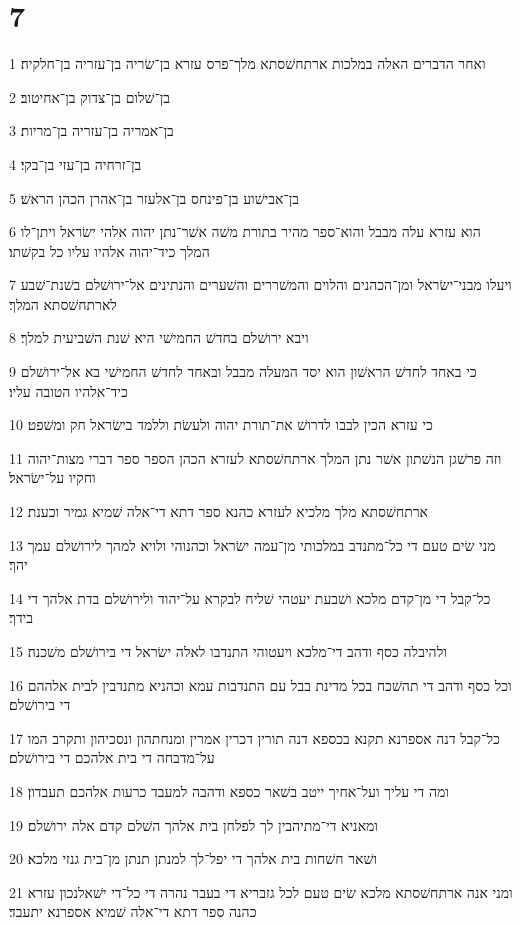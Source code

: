 \chapter{7}

\par 1 ואחר הדברים האלה במלכות ארתחשׁסתא מלך־פרס עזרא בן־שׂריה בן־עזריה בן־חלקיה׃
\par 2 בן־שׁלום בן־צדוק בן־אחיטוב׃
\par 3 בן־אמריה בן־עזריה בן־מריות׃
\par 4 בן־זרחיה בן־עזי בן־בקי׃
\par 5 בן־אבישׁוע בן־פינחס בן־אלעזר בן־אהרן הכהן הראשׁ׃
\par 6 הוא עזרא עלה מבבל והוא־ספר מהיר בתורת משׁה אשׁר־נתן יהוה אלהי ישׂראל ויתן־לו המלך כיד־יהוה אלהיו עליו כל בקשׁתו׃
\par 7 ויעלו מבני־ישׂראל ומן־הכהנים והלוים והמשׁררים והשׁערים והנתינים אל־ירושׁלם בשׁנת־שׁבע לארתחשׁסתא המלך׃
\par 8 ויבא ירושׁלם בחדשׁ החמישׁי היא שׁנת השׁביעית למלך׃
\par 9 כי באחד לחדשׁ הראשׁון הוא יסד המעלה מבבל ובאחד לחדשׁ החמישׁי בא אל־ירושׁלם כיד־אלהיו הטובה עליו׃
\par 10 כי עזרא הכין לבבו לדרושׁ את־תורת יהוה ולעשׂת וללמד בישׂראל חק ומשׁפט׃
\par 11 וזה פרשׁגן הנשׁתון אשׁר נתן המלך ארתחשׁסתא לעזרא הכהן הספר ספר דברי מצות־יהוה וחקיו על־ישׂראל׃
\par 12 ארתחשׁסתא מלך מלכיא לעזרא כהנא ספר דתא די־אלה שׁמיא גמיר וכענת׃
\par 13 מני שׂים טעם די כל־מתנדב במלכותי מן־עמה ישׂראל וכהנוהי ולויא למהך לירושׁלם עמך יהך׃
\par 14 כל־קבל די מן־קדם מלכא ושׁבעת יעטהי שׁליח לבקרא על־יהוד ולירושׁלם בדת אלהך די בידך׃
\par 15 ולהיבלה כסף ודהב די־מלכא ויעטוהי התנדבו לאלה ישׂראל די בירושׁלם משׁכנה׃
\par 16 וכל כסף ודהב די תהשׁכח בכל מדינת בבל עם התנדבות עמא וכהניא מתנדבין לבית אלההם די בירושׁלם׃
\par 17 כל־קבל דנה אספרנא תקנא בכספא דנה תורין דכרין אמרין ומנחתהון ונסכיהון ותקרב המו על־מדבחה די בית אלהכם די בירושׁלם׃
\par 18 ומה די עליך ועל־אחיך ייטב בשׁאר כספא ודהבה למעבד כרעות אלהכם תעבדון׃
\par 19 ומאניא די־מתיהבין לך לפלחן בית אלהך השׁלם קדם אלה ירושׁלם׃
\par 20 ושׁאר חשׁחות בית אלהך די יפל־לך למנתן תנתן מן־בית גנזי מלכא׃
\par 21 ומני אנה ארתחשׁסתא מלכא שׂים טעם לכל גזבריא די בעבר נהרה די כל־די ישׁאלנכון עזרא כהנה ספר דתא די־אלה שׁמיא אספרנא יתעבד׃
